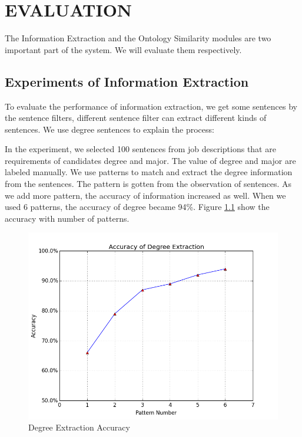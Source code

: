 \chapter{EVALUATION}

The Information Extraction and the Ontology Similarity modules are two important part of the system.  We will evaluate them respectively. 

\section{Experiments of Information Extraction }

To evaluate the performance of information extraction, we get some sentences by the sentence filters, different sentence filter can extract different kinds of sentences. We use degree sentences to explain the process: 
 
In the experiment, we selected 100 sentences from job descriptions that are requirements of candidates degree and major. The value of degree and major are labeled manually. We use patterns to  match and extract the degree information from the sentences. The pattern is gotten from the observation of sentences. As we add more pattern, the accuracy of information increased as well. When we used 6 patterns, the accuracy of degree became 94\%. Figure \ref{fig:degree_accuracy} show the accuracy with number of patterns. 

\begin{figure}[htbp]
  \centering
  \includegraphics[scale=0.5]{images/degree_accuracy.png}
  \caption{Degree Extraction  Accuracy}
  \label{fig:degree_accuracy}
\end{figure}


